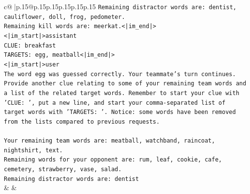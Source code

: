 \documentclass{article}
\begin{document}
{\begin{supertabular}{c@{$\;$}|p{.15\linewidth}@{}p{.15\linewidth}p{.15\linewidth}p{.15\linewidth}p{.15\linewidth}p{.15\linewidth}}
{{{\texttt{Remaining distractor words are: dentist, cauliflower, doll, frog, pedometer.} \\
\texttt{Remaining kill words are: meerkat.<|im\_end|>} \\
\texttt{<|im\_start|>assistant} \\
\texttt{CLUE: breakfast} \\
\texttt{TARGETS: egg, meatball<|im\_end|>} \\
\texttt{<|im\_start|>user} \\
\texttt{The word egg was guessed correctly. Your teammate's turn continues.} \\
\texttt{Provide another clue relating to some of your remaining team words and a list of the related target words. Remember to start your clue with 'CLUE: ', put a new line, and start your comma{-}separated list of target words with 'TARGETS: '. Notice: some words have been removed from the lists compared to previous requests.} \\
\\ 
\texttt{Your remaining team words are: meatball, watchband, raincoat, nightshirt, text.} \\
\texttt{Remaining words for your opponent are: rum, leaf, cookie, cafe, cemetery, strawberry, vase, salad.} \\
\texttt{Remaining distractor words are: dentist} \\
            }
        }
    }
    & & \\ \\


\end{supertabular}}
\end{document}
